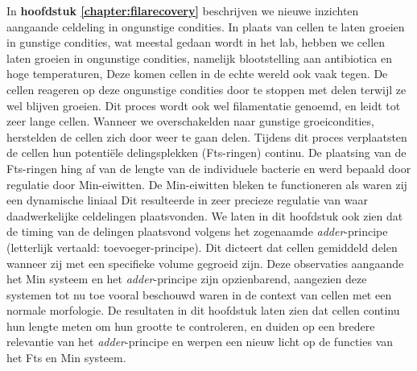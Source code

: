 In \textbf{hoofdstuk \ref{chapter:filarecovery}} beschrijven we nieuwe inzichten aangaande celdeling in ongunstige condities.
%
In plaats van cellen te laten groeien in gunstige condities, wat meestal gedaan wordt in het lab, hebben we cellen laten groeien in ongunstige condities, 
%
namelijk blootstelling aan antibiotica en hoge temperaturen, 
Deze komen cellen in de echte wereld ook vaak tegen. 
%
De cellen reageren op deze ongunstige condities door te stoppen met delen terwijl ze wel blijven groeien. 
%
Dit proces wordt ook wel filamentatie genoemd, 
en leidt tot zeer lange cellen.
%
Wanneer we overschakelden naar gunstige groeicondities, 
herstelden de cellen zich door weer te gaan delen.
%
Tijdens dit proces verplaatsten de cellen hun potentiële delingsplekken (Fts-ringen) continu.
%
De plaatsing van de Fts-ringen hing af van de lengte van de individuele bacterie en werd bepaald door regulatie door Min-eiwitten.
%
De Min-eiwitten bleken te functioneren als waren zij een dynamische liniaal
%
Dit resulteerde
in zeer precieze regulatie van waar
daadwerkelijke celdelingen plaatsvonden.
%
We laten in dit hoofdstuk ook zien dat de timing van de delingen plaatsvond volgens het zogenaamde \textit{adder}-principe (letterlijk vertaald: toevoeger-principe). 
Dit dicteert dat cellen gemiddeld delen wanneer zij met een specifieke volume gegroeid zijn.
%
Deze observaties aangaande het Min systeem en het \textit{adder}-principe zijn opzienbarend, 
aangezien deze systemen tot nu toe vooral beschouwd waren in de context van cellen met een normale morfologie.
%
De resultaten in dit hoofdstuk laten zien dat \ecoli cellen continu hun lengte meten om hun grootte te controleren,
en duiden op een bredere relevantie van het 
\textit{adder}-principe en werpen een nieuw licht  
op de functies van het Fts en Min systeem.




